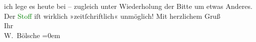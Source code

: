                     ich lege es heute bei – zugleich unter Wiederholung der Bitte um etwas Anderes.
                    Der \textcolor{green}{Stoff}{} iſt wirklich
                    »zeitſchriftlich« unmöglich!\pend
           \pstart
           Mit herzlichem Gruß{\\[\baselineskip]}Ihr{\\[\baselineskip]}\spacefill\mbox{W. Bölsche}\pend
           \leftskip=0em{}\endnumbering{}  
      